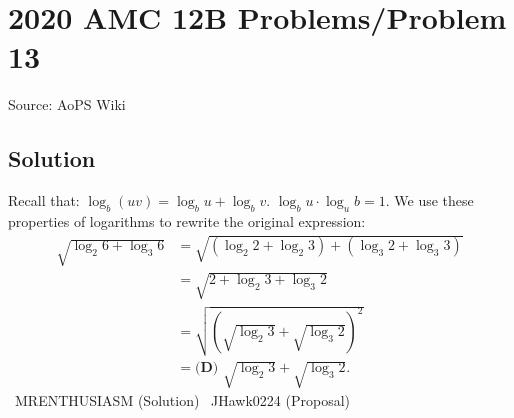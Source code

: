 \documentclass[12pt]{article}
\begin{document}
\section*{{2020 AMC 12B Problems/Problem 13}}
Source: AoPS Wiki

\subsection*{Solution}
Recall that: $\log_b{(uv)}=\log_b u + \log_b v.$ $\log_b u\cdot\log_u b=1.$ We use these properties of logarithms to rewrite the original expression: \begin{align*} \sqrt{\log_2{6}+\log_3{6}}&=\sqrt{(\log_2{2}+\log_2{3})+(\log_3{2}+\log_3{3})} \\ &=\sqrt{2+\log_2{3}+\log_3{2}} \\ &=\sqrt{\left(\sqrt{\log_2{3}}+\sqrt{\log_3{2}}\right)^2} \\ &=\boxed{\textbf{(D) } \sqrt{\log_2{3}}+\sqrt{\log_3{2}}}. \end{align*} ~MRENTHUSIASM (Solution) ~JHawk0224 (Proposal)
\end{document}
